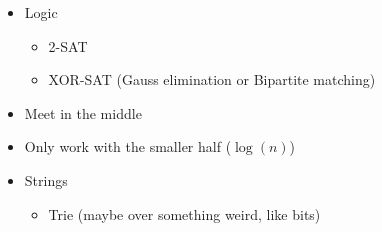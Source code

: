 \documentclass[8pt,a4paper,landscape,oneside]{amsart}
\newenvironment{myitemize}
{\begin{itemize}[leftmargin=.3cm]
	\setlength{\itemsep}{0pt}
	\setlength{\parskip}{0pt}
	\setlength{\parsep}{0pt}     }
{ \end{itemize}                  }
\begin{document}
\begin{multicols*}{3}
\begin{myitemize}
\begin{itemize}
			\item Permutations
				\begin{itemize}
					\item Consider the cycles of the permutation
				\end{itemize}
			\item Functions
				\begin{itemize}
					\item Sum of piecewise-linear functions is a piecewise-linear function
					\item Sum of convex (concave) functions is convex (concave)
				\end{itemize}
			\item Modular arithmetic
				\begin{itemize}
					\item Chinese Remainder Theorem
					\item Linear Congruence
				\end{itemize}
			\item Sieve
			\item System of linear equations
			\item Values too big to represent?
				\begin{itemize}
					\item Compute using the logarithm
					\item Divide everything by some large value
				\end{itemize}
			\item Linear programming
				\begin{itemize}
					\item Is the dual problem easier to solve?
				\end{itemize}
			\item Can the problem be modeled as a different combinatorial problem? Does that simplify calculations?
		\end{itemize}
	\item Logic
		\begin{itemize}
			\item 2-SAT
			\item XOR-SAT (Gauss elimination or Bipartite matching)
		\end{itemize}
	\item Meet in the middle
	\item Only work with the smaller half ($\log(n)$)
	\item Strings
		\begin{itemize}
			\item Trie (maybe over something weird, like bits)

\end{itemize}
\end{myitemize}
\end{multicols*}
\end{document}
